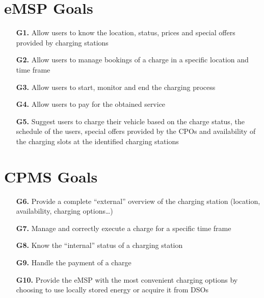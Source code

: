 \documentclass[12pt]{report}
\begin{document}
\section{eMSP Goals}
\begin{itemize}
    \item[\textbf{G1.}]   Allow users to know the location, status, prices and special offers provided by charging stations
    \item[\textbf{G2.}]  Allow users to manage bookings of  a charge in a specific location and time frame
    \item[\textbf{G3.}] Allow users to start, monitor and end the charging process
    \item[\textbf{G4.}] Allow users to pay for the obtained service
    \item[\textbf{G5.}] Suggest users to charge their vehicle based on the charge status, the schedule of the users, special offers provided by the CPOs and availability of the charging slots at the identified charging stations\\
\end{itemize}

\section{CPMS Goals}
\begin{itemize}
    \item[\textbf{G6.}] Provide a complete “external” overview of the charging station (location, availability, charging options…)
    \item[\textbf{G7.}] Manage and correctly execute a charge for a specific time frame
    \item[\textbf{G8.}] Know the “internal” status of a charging station
    \item[\textbf{G9.}] Handle the payment of a charge
    \item[\textbf{G10.}] Provide the eMSP with the most convenient charging options by choosing to use locally stored energy or acquire it from DSOs
\end{itemize}
\end{document}
